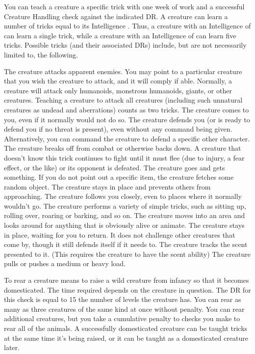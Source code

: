          You can teach a creature a specific trick with one week of work and a successful Creature Handling check against the indicated DR. A creature can learn a number of tricks equal to its Intelligence . Thus, a creature with an Intelligence of  can learn a single trick, while a creature with an Intelligence of  can learn five tricks. Possible tricks (and their associated DRs) include, but are not necessarily limited to, the following.

         The creature attacks apparent enemies. You may point to a particular creature that you wish the creature to attack, and it will comply if able. Normally, a creature will attack only humanoids, monstrous humanoids, giants, or other creatures. Teaching a creature to attack all creatures (including such unnatural creatures as undead and aberrations) counts as two tricks.
         The creature comes to you, even if it normally would not do so.
         The creature defends you (or is ready to defend you if no threat is present), even without any command being given. Alternatively, you can command the creature to defend a specific other character.
         The creature breaks off from combat or otherwise backs down. A creature that doesn't know this trick continues to fight until it must flee (due to injury, a fear effect, or the like) or its opponent is defeated.
         The creature goes and gets something. If you do not point out a specific item, the creature fetches some random object.
         The creature stays in place and prevents others from approaching.
         The creature follows you closely, even to places where it normally wouldn't go.
         The creature performs a variety of simple tricks, such as sitting up, rolling over, roaring or barking, and so on.
         The creature moves into an area and looks around for anything that is obviously alive or animate.
         The creature stays in place, waiting for you to return. It does not challenge other creatures that come by, though it still defends itself if it needs to.
         The creature tracks the scent presented to it. (This requires the creature to have the scent ability)
         The creature pulls or pushes a medium or heavy load.

         To rear a creature means to raise a wild creature from infancy so that it becomes domesticated. The time required depends on the creature in question. The DR for this check is equal to 15 \add the number of levels the creature has. You can rear as many as three creatures of the same kind at once without penalty. You can rear additional creatures, but you take a cumulative  penalty to checks you make to rear all of the animals. A successfully domesticated creature can be taught tricks at the same time it's being raised, or it can be taught as a domesticated creature later.

